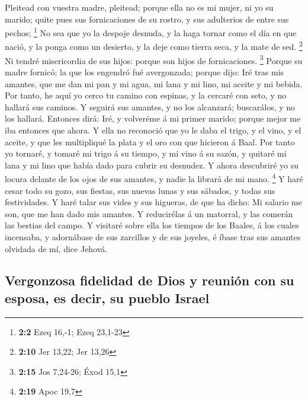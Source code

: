 Pleitead con vuestra madre, pleitead; porque ella no es mi
mujer, ni yo su marido; quite pues sus fornicaciones de su rostro, y sus
adulterios de entre sus pechos; \footnote{\textbf{2:2} Ezeq 16,-1; Ezeq
  23,1-23}  No sea que yo la despoje desnuda, y la haga
tornar como el día en que nació, y la ponga como un desierto, y la deje
como tierra seca, y la mate de sed. \footnote{\textbf{2:10} Jer 13,22;
  Jer 13,26}  Ni tendré misericordia de sus hijos: porque
son hijos de fornicaciones. \footnote{\textbf{2:15} Jos 7,24-26; Éxod
  15,1}  Porque su madre fornicó; la que los engendró fué
avergonzada; porque dijo: Iré tras mis amantes, que me dan mi pan y mi
agua, mi lana y mi lino, mi aceite y mi bebida.  Por tanto,
he aquí yo cerco tu camino con espinas, y la cercaré con seto, y no
hallará sus caminos.  Y seguirá sus amantes, y no los
alcanzará; buscarálos, y no los hallará. Entonces dirá: Iré, y volveréme
á mi primer marido; porque mejor me iba entonces que ahora. 
Y ella no reconoció que yo le daba el trigo, y el vino, y el aceite, y
que les multipliqué la plata y el oro con que hicieron á Baal.
 Por tanto yo tornaré, y tomaré mi trigo á su tiempo, y mi
vino á su sazón, y quitaré mi lana y mi lino que había dado para cubrir
su desnudez.  Y ahora descubriré yo su locura delante de
los ojos de sus amantes, y nadie la librará de mi mano. \footnote{\textbf{2:19}
  Apoc 19,7}  Y haré cesar todo su gozo, sus fiestas, sus
nuevas lunas y sus sábados, y todas sus festividades.  Y
haré talar sus vides y sus higueras, de que ha dicho: Mi salario me son,
que me han dado mis amantes. Y reducirélas á un matorral, y las comerán
las bestias del campo.  Y visitaré sobre ella los tiempos
de los Baales, á los cuales incensaba, y adornábase de sus zarcillos y
de sus joyeles, é íbase tras sus amantes olvidada de mí, dice Jehová.

\hypertarget{vergonzosa-fidelidad-de-dios-y-reuniuxf3n-con-su-esposa-es-decir-su-pueblo-israel}{%
\subsection{Vergonzosa fidelidad de Dios y reunión con su esposa, es
decir, su pueblo
Israel}\label{vergonzosa-fidelidad-de-dios-y-reuniuxf3n-con-su-esposa-es-decir-su-pueblo-israel}}

